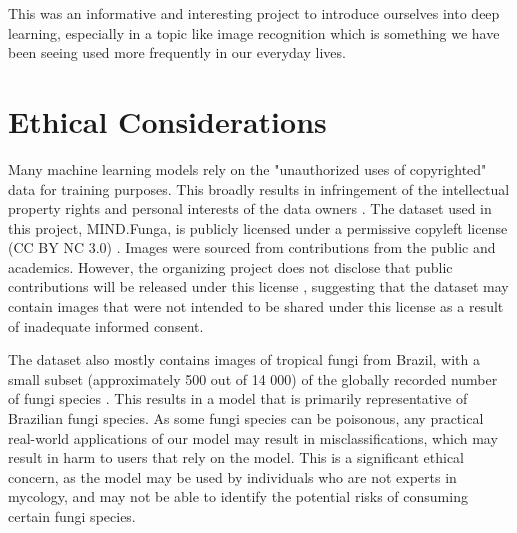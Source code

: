 \documentclass{article} %
\begin{document}
This was an informative and interesting project to introduce ourselves into deep learning, especially in a topic like image recognition which is something we have been seeing used more frequently in our everyday lives.

\section{Ethical Considerations}
\label{sec:ethics}
Many machine learning models rely on the "unauthorized uses of copyrighted" data for training purposes. This broadly results in infringement of the intellectual property rights and personal interests of the data owners \citep{Sobel.TaxonomyTrainingData.2021}. The dataset used in this project, MIND.Funga, is publicly licensed under a permissive copyleft license (CC BY NC 3.0) \citep{Drechsler-SantosKarstedtEtAl.MINDFunga.2023}. Images were sourced from contributions from the public and academics. However, the organizing project does not disclose that public contributions will be released under this license \citep{Drechsler-SantosKarstedtEtAl.MINDFunga.2023}, suggesting that the dataset may contain images that were not intended to be shared under this license as a result of inadequate informed consent.

The dataset also mostly contains images of tropical fungi from Brazil, with a small subset (approximately 500 out of 14 000) of the globally recorded number of fungi species \citep{LuckingAimeEtAl.UnambiguousIdentificationFungi.2020}. This results in a model that is primarily representative of Brazilian fungi species. As some fungi species can be poisonous, any practical real-world applications of our model may result in misclassifications, which may result in harm to users that rely on the model. This is a significant ethical concern, as the model may be used by individuals who are not experts in mycology, and may not be able to identify the potential risks of consuming certain fungi species.

\label{last_page}



\end{document}
